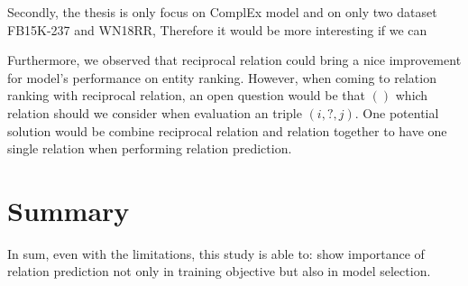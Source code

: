Secondly, the thesis is only focus on ComplEx model and on only two dataset FB15K-237 and WN18RR, Therefore it would be more interesting if we can 


Furthermore, we observed that reciprocal relation could bring a nice improvement for model's performance on entity ranking. However, when coming to relation ranking with reciprocal relation, an open question would be that $()$ which relation should we consider when evaluation an triple $(i, ?, j)$. One potential solution would be combine reciprocal relation and relation together to have one single relation when performing relation prediction. 


\section{Summary}
In sum, even with the limitations, this study is able to: show importance of relation prediction not only in training objective but also in model selection. 
 
